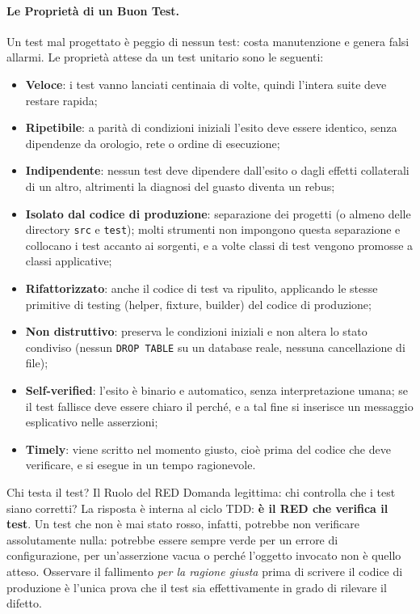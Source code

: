 \documentclass[12pt]{extarticle}
\begin{document}
\paragraph{Le Proprietà di un Buon Test.}
Un test mal progettato è peggio di nessun test: costa manutenzione e genera falsi allarmi. Le proprietà attese da un test unitario sono le seguenti:
\begin{itemize}
    \item \textbf{Veloce}: i test vanno lanciati centinaia di volte, quindi l'intera suite deve restare rapida;
    \item \textbf{Ripetibile}: a parità di condizioni iniziali l'esito deve essere identico, senza dipendenze da orologio, rete o ordine di esecuzione;
    \item \textbf{Indipendente}: nessun test deve dipendere dall'esito o dagli effetti collaterali di un altro, altrimenti la diagnosi del guasto diventa un rebus;
    \item \textbf{Isolato dal codice di produzione}: separazione dei progetti (o almeno delle directory \texttt{src} e \texttt{test}); molti strumenti non impongono questa separazione e collocano i test accanto ai sorgenti, e a volte classi di test vengono promosse a classi applicative;
    \item \textbf{Rifattorizzato}: anche il codice di test va ripulito, applicando le stesse primitive di testing (helper, fixture, builder) del codice di produzione;
    \item \textbf{Non distruttivo}: preserva le condizioni iniziali e non altera lo stato condiviso (nessun \texttt{DROP TABLE} su un database reale, nessuna cancellazione di file);
    \item \textbf{Self-verified}: l'esito è binario e automatico, senza interpretazione umana; se il test fallisce deve essere chiaro il perché, e a tal fine si inserisce un messaggio esplicativo nelle asserzioni;
    \item \textbf{Timely}: viene scritto nel momento giusto, cioè prima del codice che deve verificare, e si esegue in un tempo ragionevole.
\end{itemize}

\begin{cbox}{Chi testa il test? Il Ruolo del RED}
Domanda legittima: chi controlla che i test siano corretti? La risposta è interna al ciclo TDD: \textbf{è il RED che verifica il test}. Un test che non è mai stato rosso, infatti, potrebbe non verificare assolutamente nulla: potrebbe essere sempre verde per un errore di configurazione, per un'asserzione vacua o perché l'oggetto invocato non è quello atteso. Osservare il fallimento \textit{per la ragione giusta} prima di scrivere il codice di produzione è l'unica prova che il test sia effettivamente in grado di rilevare il difetto.
\end{cbox}
\end{document}
